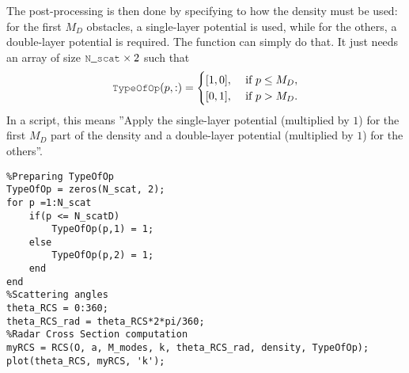 The post-processing is then done by specifying to \mudiff how the density must be used: for the first $M_D$ obstacles, a single-layer potential is used,
while for the others, a double-layer potential is required. The \RCS function can simply do that. It just needs an array  of size
 $\code{N\_scat}\times 2$ such that
$$
\code{TypeOfOp}(p,:) = \begin{cases}
[1,0], &\text{ if } p \leq M_D,\\
[0,1], &\text{ if } p > M_D.
\end{cases}
$$
In a \mudiff script, this  means ''Apply the single-layer potential (multiplied by $1$) for the first $M_D$ part of the density and a double-layer potential
 (multiplied by $1$) for the others''.
 \newpage
\begin{lstlisting}
%Preparing TypeOfOp
TypeOfOp = zeros(N_scat, 2);
for p =1:N_scat
	if(p <= N_scatD)
		TypeOfOp(p,1) = 1;
	else
		TypeOfOp(p,2) = 1;
	end
end
%Scattering angles
theta_RCS = 0:360;
theta_RCS_rad = theta_RCS*2*pi/360;
%Radar Cross Section computation
myRCS = RCS(O, a, M_modes, k, theta_RCS_rad, density, TypeOfOp);
plot(theta_RCS, myRCS, 'k');
\end{lstlisting}



